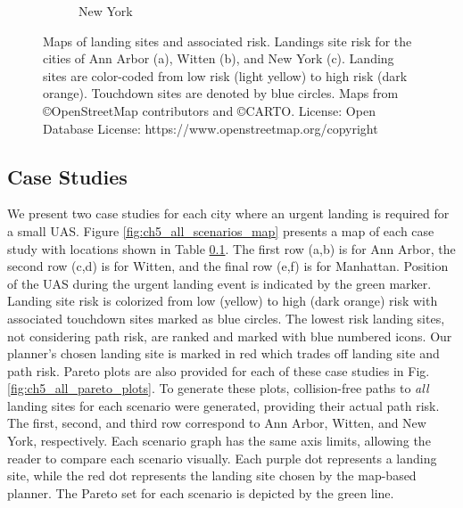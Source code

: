 \begin{figure}[!t]
\begin{subfigure}[b]{0.44\textwidth}
   \caption{New York}\label{fig:ch5_ny_all_risk}
 \end{subfigure}
 \caption[Maps of landing sites and associated risk]{Maps of landing sites and associated risk. Landings site risk for the cities of Ann Arbor (a), Witten (b), and New York (c). Landing sites are color-coded from low risk (light yellow) to high risk (dark orange). Touchdown sites are denoted by blue circles. Maps from \copyright OpenStreetMap contributors and \copyright CARTO. License: Open Database License: https://www.openstreetmap.org/copyright}\label{fig:ch5_all_ls_risk}
\end{figure}


\subsection{Case Studies}\label{sec:ch5_case_studies}

We present two case studies for each city where an urgent landing is required for a small UAS.  Figure \ref{fig:ch5_all_scenarios_map} presents a map of each case study with locations shown in Table \ref{sec:ch5_case_studies}. The first row (a,b) is for Ann Arbor, the second row (c,d) is for Witten, and the final row (e,f) is for Manhattan. Position of the \ac{UAS} during the urgent landing event is indicated by the green marker. Landing site risk is colorized from low (yellow) to high (dark orange) risk with associated touchdown sites marked as blue circles. The lowest risk landing sites, not considering path risk, are ranked and marked with blue numbered icons. Our planner's chosen landing site is marked in red which trades off landing site and path risk. 
Pareto plots are also provided for each of these case studies in Fig. \ref{fig:ch5_all_pareto_plots}. To generate these plots, collision-free paths to \textit{all} landing sites for each scenario were generated, providing their actual path risk. The first, second, and third row correspond to Ann Arbor, Witten, and New York, respectively.  Each scenario graph has the same axis limits, allowing the reader to compare each scenario visually. Each purple dot represents a landing site, while the red dot represents the landing site chosen by the map-based planner. The Pareto set for each scenario is depicted by the green line. 


